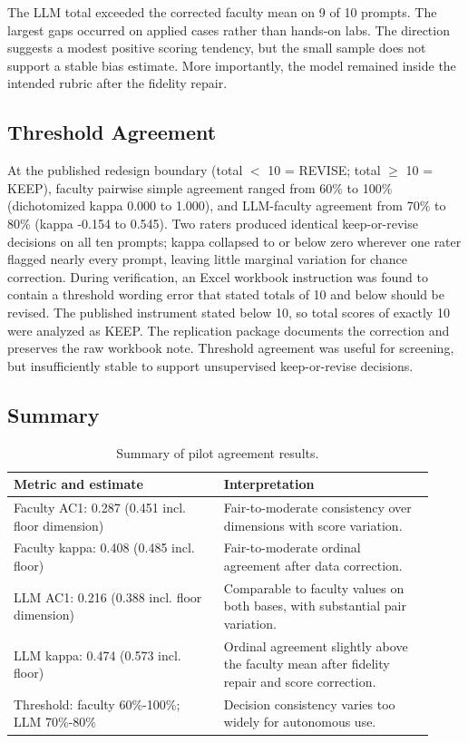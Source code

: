 \documentclass[sigconf]{acmart}
\begin{document}
The LLM total exceeded the corrected faculty mean on 9 of 10 prompts. The largest gaps occurred on applied cases rather than hands-on labs. The direction suggests a modest positive scoring tendency, but the small sample does not support a stable bias estimate. More importantly, the model remained inside the intended rubric after the fidelity repair.

\subsection{Threshold Agreement}
At the published redesign boundary (total $<$ 10 = REVISE; total $\geq$ 10 = KEEP), faculty pairwise simple agreement ranged from 60\% to 100\% (dichotomized kappa 0.000 to 1.000), and LLM-faculty agreement from 70\% to 80\% (kappa -0.154 to 0.545). Two raters produced identical keep-or-revise decisions on all ten prompts; kappa collapsed to or below zero wherever one rater flagged nearly every prompt, leaving little marginal variation for chance correction. During verification, an Excel workbook instruction was found to contain a threshold wording error that stated totals of 10 and below should be revised. The published instrument stated below 10, so total scores of exactly 10 were analyzed as KEEP. The replication package documents the correction and preserves the raw workbook note. Threshold agreement was useful for screening, but insufficiently stable to support unsupervised keep-or-revise decisions.

\subsection{Summary}
\begin{table}[t]
\caption{Summary of pilot agreement results.}
\label{tab:summary}
\begin{tabular}{@{}p{0.46\linewidth}p{0.46\linewidth}@{}}
\toprule
Metric and estimate & Interpretation \\
\midrule
Faculty AC1: 0.287 (0.451 incl. floor dimension) & Fair-to-moderate consistency over dimensions with score variation. \\
Faculty kappa: 0.408 (0.485 incl. floor) & Fair-to-moderate ordinal agreement after data correction. \\
LLM AC1: 0.216 (0.388 incl. floor dimension) & Comparable to faculty values on both bases, with substantial pair variation. \\
LLM kappa: 0.474 (0.573 incl. floor) & Ordinal agreement slightly above the faculty mean after fidelity repair and score correction. \\
Threshold: faculty 60\%-100\%; LLM 70\%-80\% & Decision consistency varies too widely for autonomous use. \\
\bottomrule
\end{tabular}
\end{table}
\end{document}
